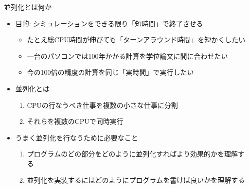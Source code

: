 \documentclass[dvipdfmx]{beamer}
\begin{document}
\begin{frame}[t,fragile]{並列化とは何か}
  \begin{itemize}
    \setlength{\itemsep}{1em}
  \item 目的: シミュレーションをできる限り「短時間」で終了させる
    \begin{itemize}
      \item たとえ総CPU時間が伸びても「ターンアラウンド時間」を短かくしたい
      \item 一台のパソコンでは100年かかる計算を学位論文に間に合わせたい
      \item 今の100倍の精度の計算を同じ「実時間」で実行したい
    \end{itemize}
  \item 並列化とは
    \begin{enumerate}
    \item CPUの行なうべき仕事を複数の小さな仕事に分割
    \item それらを複数のCPUで同時実行
    \end{enumerate}
  \item うまく並列化を行なうために必要なこと
    \begin{enumerate}
    \item プログラムのどの部分をどのように並列化すればより効果的かを理解する
    \item 並列化を実装するにはどのようにプログラムを書けば良いかを理解する
    \end{enumerate}
  \end{itemize}
\end{frame}
\end{document}
